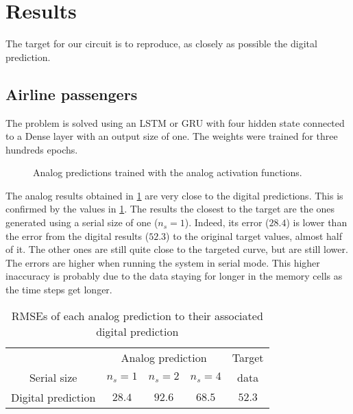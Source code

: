 \section{Results}

The target for our circuit is to reproduce, as closely as possible the digital prediction.

\subsection{Airline passengers}

The problem is solved using an LSTM or GRU with four hidden state connected to a Dense layer with an output size of one. The weights were trained for three hundreds epochs.

\begin{figure}[b]
  \centering
  
  \caption{Analog predictions trained with the analog activation functions.}
  \label{graph:airlineAnalog}
\end{figure}

The analog results obtained in \cref{graph:airlineAnalog} are very close to the digital predictions. This is confirmed by the values in \cref{tab:airlineAnalog}. The results the closest to the target are the ones generated using a serial size of one ($n_s=1$). Indeed, its error ($28.4$) is lower than the error from the digital results ($52.3$) to the original target values, almost half of it. The other ones are still quite close to the targeted curve, but are still lower. The errors are higher when running the system in serial mode. This higher inaccuracy is probably due to the data staying for longer in the memory cells as the time steps get longer.

\begin{table}[t]
  \caption{\acp{RMSE} of each analog prediction to their associated digital prediction}
  \label{tab:airlineAnalog}
  \centering
  \begin{tabular}{|c|c|c|c|c|}
    \cline{2-5}
    \multicolumn{1}{c}{}& \multicolumn{3}{|c|}{Analog prediction} &Target\\
    \cline{1-4}
    Serial size & $n_s=1$ & $n_s=2$ & $n_s=4$ & data\\
    \hline
    Digital prediction & $28.4$ & $92.6$ & $68.5$ & $52.3$\\
    \hline
  \end{tabular}
\end{table}

